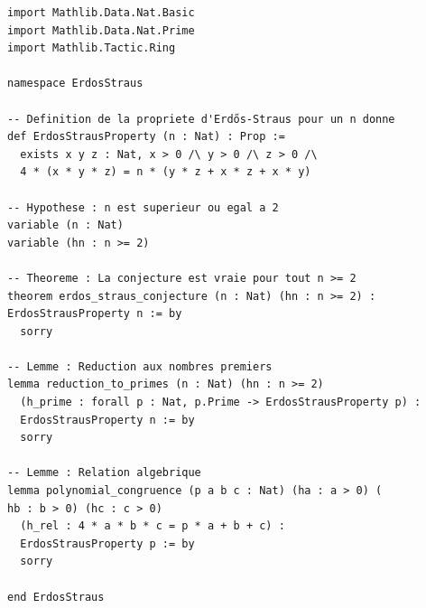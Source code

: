 \documentclass[11pt,a4paper]{article}
\begin{document}
\begin{verbatim}
import Mathlib.Data.Nat.Basic
import Mathlib.Data.Nat.Prime
import Mathlib.Tactic.Ring

namespace ErdosStraus

-- Definition de la propriete d'Erdős-Straus pour un n donne
def ErdosStrausProperty (n : Nat) : Prop :=
  exists x y z : Nat, x > 0 /\ y > 0 /\ z > 0 /\
  4 * (x * y * z) = n * (y * z + x * z + x * y)

-- Hypothese : n est superieur ou egal a 2
variable (n : Nat)
variable (hn : n >= 2)

-- Theoreme : La conjecture est vraie pour tout n >= 2
theorem erdos_straus_conjecture (n : Nat) (hn : n >= 2) :
ErdosStrausProperty n := by
  sorry

-- Lemme : Reduction aux nombres premiers
lemma reduction_to_primes (n : Nat) (hn : n >= 2)
  (h_prime : forall p : Nat, p.Prime -> ErdosStrausProperty p) :
  ErdosStrausProperty n := by
  sorry

-- Lemme : Relation algebrique
lemma polynomial_congruence (p a b c : Nat) (ha : a > 0) (
hb : b > 0) (hc : c > 0)
  (h_rel : 4 * a * b * c = p * a + b + c) :
  ErdosStrausProperty p := by
  sorry

end ErdosStraus
\end{verbatim}
\end{document}
